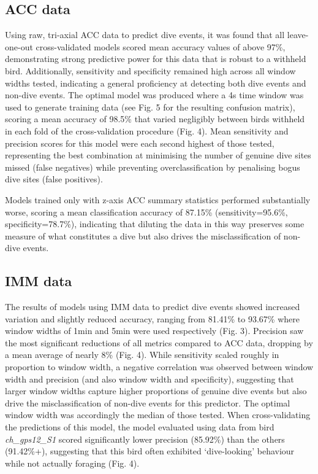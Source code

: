 \documentclass[11pt]{article}
\begin{document}
    \subsection{ACC data}
    Using raw, tri-axial ACC data to predict dive events, it was found that all leave-one-out cross-validated models scored mean accuracy values of above 97\%, demonstrating strong predictive power for this data that is robust to a withheld bird. Additionally, sensitivity and specificity remained high across all window widths tested, indicating a general proficiency at detecting both dive events and non-dive events.
    The optimal model was produced where a 4s time window was used to generate training data (see Fig. 5 for the resulting confusion matrix), scoring a mean accuracy of 98.5\% that varied negligibly between birds withheld in each fold of the cross-validation procedure (Fig. 4). Mean sensitivity and precision scores for this model were each second highest of those tested, representing the best combination at minimising the number of genuine dive sites missed (false negatives) while preventing overclassification by penalising bogus dive sites (false positives).
    
    Models trained only with z-axis ACC summary statistics performed substantially worse, scoring a mean classification accuracy of 87.15\% (sensitivity=95.6\%, specificity=78.7\%), indicating that diluting the data in this way preserves some measure of what constitutes a dive but also drives the misclassification of non-dive events.
    
    \subsection{IMM data}
    The results of models using IMM data to predict dive events showed increased variation and slightly reduced accuracy, ranging from 81.41\% to 93.67\% where window widths of 1min and 5min were used respectively (Fig. 3). Precision saw the most significant reductions of all metrics compared to ACC data, dropping by a mean average of nearly 8\% (Fig. 4). While sensitivity scaled roughly in proportion to window width, a negative correlation was observed between window width and precision (and also window width and specificity), suggesting that larger window widths capture higher proportions of genuine dive events but also drive the misclassification of non-dive events for this predictor. The optimal window width was accordingly the median of those tested. When cross-validating the predictions of this model, the model evaluated using data from bird \emph{ch\_gps12\_S1} scored significantly lower precision (85.92\%) than the others (91.42\%+), suggesting that this bird often exhibited ‘dive-looking’ behaviour while not actually foraging (Fig. 4).
    
\end{document}

